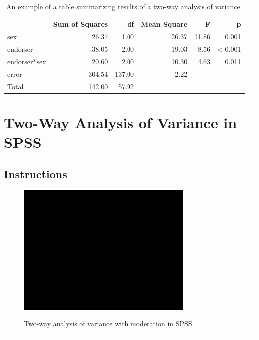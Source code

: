 \documentclass[a4paper]{book}
\theoremstyle{definition}
\theoremstyle{definition}
\theoremstyle{definition}
\theoremstyle{remark}
\begin{document}
\begin{table}[H]

\caption{\label{tab:2way-table}An example of a table summarizing results of a two-way analysis of variance.}
\centering
\fontsize{8}{8}\selectfont
\begin{tabular}[t]{lrrrrr}
\hline
  & Sum of Squares & df & Mean Square & F & p\\
\hline
sex & 26.37 & 1.00 & 26.37 & 11.86 & 0.001\\
endorser & 38.05 & 2.00 & 19.03 & 8.56 & < 0.001\\
endorser*sex & 20.60 & 2.00 & 10.30 & 4.63 & 0.011\\
error & 304.54 & 137.00 & 2.22 &  & \\
Total & 142.00 & 57.92 &  &  & \\
\hline
\end{tabular}
\end{table}

\section{Two-Way Analysis of Variance in SPSS}\label{twowaySPSS}

\subsection{Instructions}\label{instructions-5}

\begin{figure}[H]
\href{https://www.youtube.com/embed/w--5GoJ-sQ8}{\includegraphics[width=320px]{GentleIntro_files/figure-latex/SPSS2way-1} }\caption{Two-way analysis of variance with moderation in SPSS.}\label{fig:SPSS2way}
\end{figure}

\begin{center}\rule{0.5\linewidth}{\linethickness}\end{center}
\end{document}
